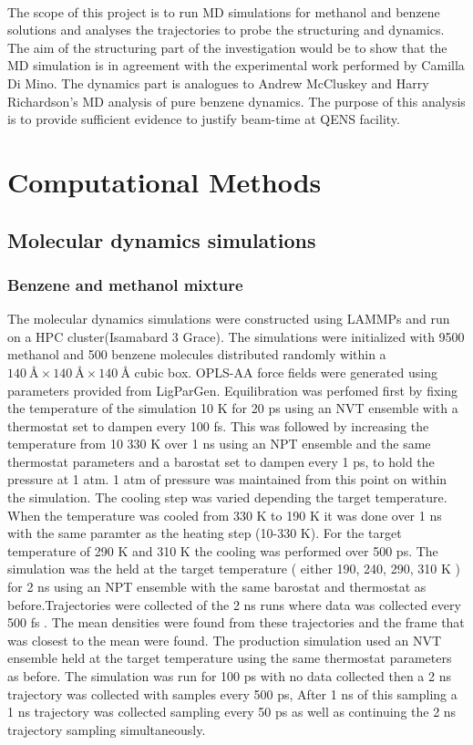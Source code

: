\documentclass{report}
\begin{document}
\paragraph{}
The scope of this project is to run MD simulations for methanol and benzene solutions and analyses the trajectories to probe the structuring and dynamics. The aim of the structuring part of the investigation would be to show that the MD simulation is in agreement with the experimental work performed by Camilla Di Mino. The dynamics part is analogues to Andrew McCluskey and Harry Richardson's MD analysis of pure benzene dynamics. The purpose of this analysis is to provide sufficient evidence to justify beam-time at QENS facility.

\section{Computational Methods}

\subsection{Molecular dynamics simulations}

\subsubsection{Benzene and methanol mixture}

The molecular dynamics simulations were constructed using LAMMPs and run on a HPC cluster(Isamabard 3 Grace). The simulations were initialized with 9500 methanol and 500 benzene molecules distributed randomly within a $140\:\si{\angstrom} \times 140\:\si{\angstrom} \times 140\:\si{\angstrom}$ cubic box. OPLS-AA force fields were generated using parameters provided from LigParGen. Equilibration was perfomed first by fixing the temperature of the simulation 10 K for 20 ps using an NVT ensemble with a thermostat set to dampen every 100 fs. This was followed by increasing the temperature from 10 330 K over 1 ns using an NPT ensemble and the same thermostat parameters and a barostat set to dampen every 1 ps, to hold the pressure at 1 atm. 1 atm of pressure was maintained from this point on within the simulation. The cooling step was varied depending the target temperature. When the temperature was cooled from 330 K to 190 K it was done over 1 ns with the same paramter as the heating step (10-330 K). For the target temperature of 290 K and 310 K the cooling was performed over 500 ps. The simulation was the held at the target temperature ( either 190, 240, 290, 310 K ) for 2 ns using an NPT ensemble with the same barostat and thermostat as before.Trajectories were collected of the 2 ns runs where data was collected every 500 fs . The mean densities were found from these trajectories and the frame that was closest to the mean were found. The production simulation used an NVT ensemble held at the target temperature using the same thermostat parameters as before. The simulation was run for 100 ps with no data collected then a 2 ns trajectory was collected with samples every 500 ps, After 1 ns of this sampling a 1 ns trajectory was collected sampling every 50 ps as well as continuing the 2 ns trajectory sampling simultaneously.
\end{document}

